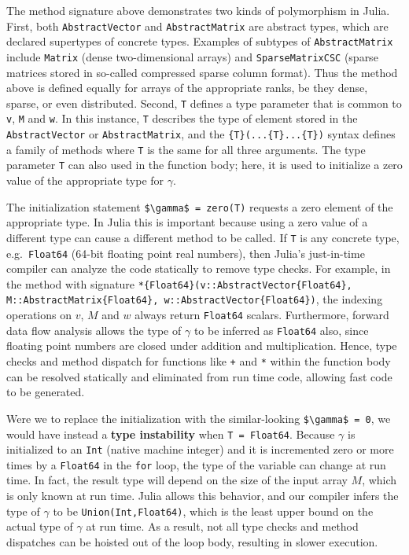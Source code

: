 \documentclass[10pt, preprint]{sigplanconf}
\begin{document}
The method signature above demonstrates two kinds of polymorphism in Julia.
First, both \lstinline|AbstractVector| and \lstinline|AbstractMatrix| are
abstract types, which are declared supertypes of concrete types. Examples of
subtypes of \lstinline|AbstractMatrix| include \lstinline|Matrix| (dense
two-dimensional arrays) and \lstinline|SparseMatrixCSC| (sparse matrices stored
in so-called compressed sparse column format). Thus the method above is defined
equally for arrays of the appropriate ranks, be they dense, sparse, or even
distributed.  Second, \lstinline|T| defines a type parameter that is common to
\lstinline|v|, \lstinline|M| and \lstinline|w|. In this instance, \lstinline|T|
describes the type of element stored in the \lstinline|AbstractVector| or
\lstinline|AbstractMatrix|, and the \lstinline|{T}(...{T}...{T})| syntax
defines a family of methods where \lstinline|T| is the same for all three
arguments. The type parameter \lstinline|T| can also used in the function body;
here, it is used to initialize a zero value of the appropriate type for
$\gamma$.

The initialization statement \lstinline|$\gamma$ = zero(T)| requests a zero
element of the appropriate type.
In Julia this is important because using a zero value of a different type can
cause a different method to be called.
If \lstinline|T| is any concrete %
type, e.g.\ \lstinline|Float64| (64-bit floating point real numbers), then
Julia's just-in-time compiler can analyze the code statically to remove type
checks.  For example, in the method with signature
\lstinline|*{Float64}(v::AbstractVector{Float64}, M::AbstractMatrix{Float64}, w::AbstractVector{Float64})|,
the indexing operations on $v$, $M$ and $w$ always return \lstinline|Float64|
scalars. Furthermore, forward data flow analysis allows the type of $\gamma$
to be inferred as \lstinline|Float64| also, since floating point numbers are
closed under addition and multiplication. Hence, type checks and method
dispatch for functions like \lstinline|+| and \lstinline|*| within the function
body can be resolved statically and eliminated from run time code, allowing
fast code to be generated.

Were we to replace the initialization with the similar-looking
\lstinline|$\gamma$ = 0|, we would have instead a \textbf{type instability}
when \lstinline|T = Float64|. Because $\gamma$ is initialized to an
\lstinline|Int| (native machine integer) and it is incremented zero or more
times by a \lstinline|Float64| in the \lstinline|for| loop, the type of
the variable can change at run time.
In fact, the result type will depend on the size of the input array $M$,
which is only known at run time.
Julia allows this behavior, and our
compiler infers the type of $\gamma$ to be \lstinline|Union(Int,Float64)|,
which is the least upper bound on the actual type of $\gamma$ at run time.
As a result, not all type
checks and method dispatches can be hoisted out of the loop body, resulting
in slower execution.
\end{document}
